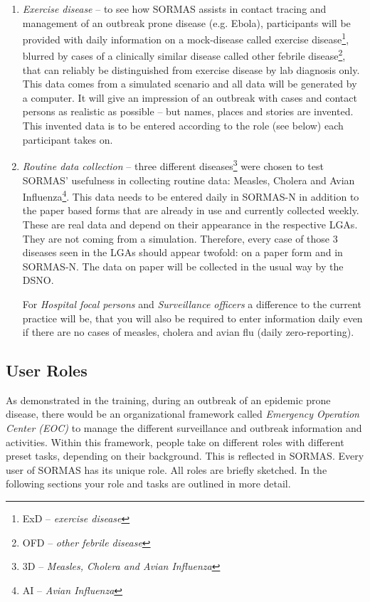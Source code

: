\documentclass[a4paper, titlepage]{tufte-handout}
\begin{document}
\begin{enumerate}
\item \emph{Exercise disease} -- to see how SORMAS assists in contact tracing and management of an outbreak prone disease (e.g. Ebola), participants will be provided with daily information on a mock-disease called exercise disease\footnote{ExD -- \emph{exercise disease}}, blurred by cases of a clinically similar disease called other febrile disease\footnote{OFD -- \emph{other febrile disease}}, that can reliably be distinguished from exercise disease by lab diagnosis only. This data comes from a simulated scenario and all data will be generated by a computer. It will give an impression of an outbreak with cases and contact persons as realistic as possible – but names, places and stories are invented. This invented data is to be entered according to the role (see below) each participant takes on.

\item \emph{Routine data collection} -- three different diseases\footnote{3D -- \emph{Measles, Cholera and Avian Influenza}} were chosen to test SORMAS’ usefulness in collecting routine data: Measles, Cholera and Avian Influenza\footnote{AI -- \emph{Avian Influenza}}. 
This data needs to be entered daily in SORMAS-N in addition to the paper based forms that are already in use and currently collected weekly. These are real data and depend on their appearance in the respective LGAs. They are not coming from a simulation. Therefore, every case of those 3 diseases seen in the LGAs should appear twofold: on a paper form and in SORMAS-N. The data on paper will be collected in the usual way by the DSNO. 

For \emph{Hospital focal persons} and \emph{Surveillance officers} a difference to the current practice will be, that you will also be required to enter information daily even if there are no cases of measles, cholera and avian flu (daily zero-reporting).
\end{enumerate}

\subsection{User Roles}
\label{sec-1-3}

As demonstrated in the training, during an outbreak of an epidemic prone disease, there would be an organizational framework called \emph{Emergency Operation Center (EOC)} to manage the different surveillance and outbreak information and activities. Within this framework, people take on different roles with different preset tasks, depending on their background. This is reflected in SORMAS. Every user of SORMAS has its unique role. All roles are briefly sketched. In the following sections your role and tasks are outlined in more detail.
\end{document}
